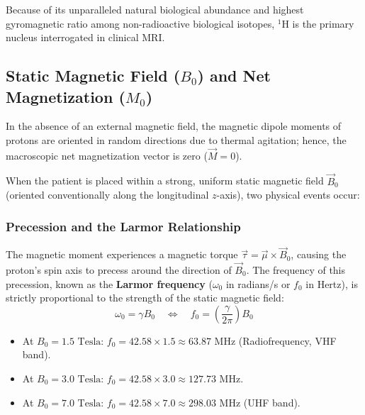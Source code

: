 \documentclass[11pt,a4paper]{article}
\begin{document}
Because of its unparalleled natural biological abundance and highest gyromagnetic ratio among non-radioactive biological isotopes, $^1\text{H}$ is the primary nucleus interrogated in clinical MRI.

\subsection{Static Magnetic Field ($B_0$) and Net Magnetization ($M_0$)}
In the absence of an external magnetic field, the magnetic dipole moments of protons are oriented in random directions due to thermal agitation; hence, the macroscopic net magnetization vector is zero ($\vec{M} = 0$).

When the patient is placed within a strong, uniform static magnetic field $\vec{B}_0$ (oriented conventionally along the longitudinal $z$-axis), two physical events occur:

\subsubsection{Precession and the Larmor Relationship}
The magnetic moment experiences a magnetic torque $\vec{\tau} = \vec{\mu} \times \vec{B}_0$, causing the proton's spin axis to precess around the direction of $\vec{B}_0$. The frequency of this precession, known as the \textbf{Larmor frequency} ($\omega_0$ in radians/s or $f_0$ in Hertz), is strictly proportional to the strength of the static magnetic field:
\begin{equation}
    \omega_0 = \gamma B_0 \quad \iff \quad f_0 = \left(\frac{\gamma}{2\pi}\right) B_0
\end{equation}

\begin{physicsoverview}
\begin{itemize}
    \item At $B_0 = 1.5\text{ Tesla}$: $f_0 = 42.58 \times 1.5 \approx 63.87\text{ MHz}$ (Radiofrequency, VHF band).
    \item At $B_0 = 3.0\text{ Tesla}$: $f_0 = 42.58 \times 3.0 \approx 127.73\text{ MHz}$.
    \item At $B_0 = 7.0\text{ Tesla}$: $f_0 = 42.58 \times 7.0 \approx 298.03\text{ MHz}$ (UHF band).
\end{itemize}
\end{physicsoverview}
\end{document}

